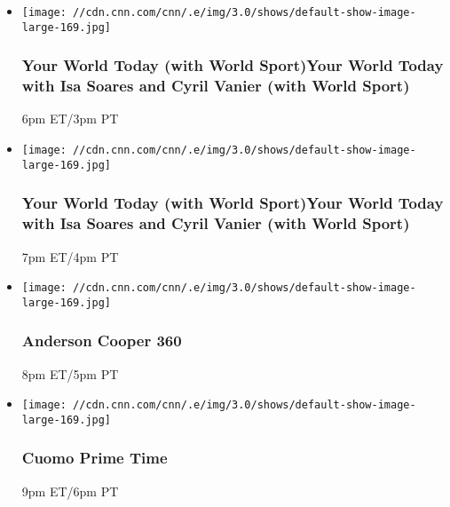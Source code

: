 \begin{itemize}
\item
  \texttt{[image: //cdn.cnn.com/cnn/.e/img/3.0/shows/default-show-image-large-169.jpg]}

  \hypertarget{your-world-today-with-world-sportyour-world-today-with-isa-soares-and-cyril-vanier-with-world-sport--6}{%
  \subsubsection{Your World Today (with World Sport)Your World Today
  with Isa Soares and Cyril Vanier (with World Sport)
  }\label{your-world-today-with-world-sportyour-world-today-with-isa-soares-and-cyril-vanier-with-world-sport--6}}

  6pm ET/3pm PT
\end{itemize}

\begin{itemize}
\item
  \texttt{[image: //cdn.cnn.com/cnn/.e/img/3.0/shows/default-show-image-large-169.jpg]}

  \hypertarget{your-world-today-with-world-sportyour-world-today-with-isa-soares-and-cyril-vanier-with-world-sport--7}{%
  \subsubsection{Your World Today (with World Sport)Your World Today
  with Isa Soares and Cyril Vanier (with World Sport)
  }\label{your-world-today-with-world-sportyour-world-today-with-isa-soares-and-cyril-vanier-with-world-sport--7}}

  7pm ET/4pm PT
\end{itemize}

\begin{itemize}
\item
  \texttt{[image: //cdn.cnn.com/cnn/.e/img/3.0/shows/default-show-image-large-169.jpg]}

  \hypertarget{anderson-cooper-360-3}{%
  \subsubsection{Anderson Cooper 360}\label{anderson-cooper-360-3}}

  8pm ET/5pm PT
\end{itemize}

\begin{itemize}
\item
  \texttt{[image: //cdn.cnn.com/cnn/.e/img/3.0/shows/default-show-image-large-169.jpg]}

  \hypertarget{cuomo-prime-time-3}{%
  \subsubsection{Cuomo Prime Time}\label{cuomo-prime-time-3}}

  9pm ET/6pm PT
\end{itemize}


